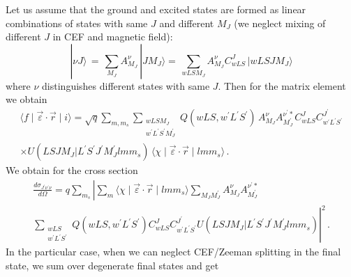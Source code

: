 \documentclass[a4paper,oneside,12pt]{extarticle}
\begin{document}
Let us assume that the ground and excited states are formed as linear combinations of states with same $J$ and different $M_J$ (we neglect mixing of different $J$ in CEF and magnetic field):
$$
| \nu J \rangle \, = \, \sum_{M_J} A^{\nu}_{M_J} \, | JM_J \rangle
= \, \sum_{wLS M_J} A^{\nu}_{M_J} C^J_{wLS} \, | wLSJM_J \rangle
$$
where $\nu$ distinguishes different states with same $J$.
Then for the matrix element we obtain
%
\begin{multline}
\langle f \mid \vec{\varepsilon} \cdot \vec{r}  \mid i \rangle = \sqrt{q}  
\sum_{m,m_s} \sum_{\substack{wLS M_J\\w^{\prime}L^{\prime} S^{\prime} M_J^{\prime}}}
Q(wLS,w^{\prime}L^{\prime} S^{\prime}) \, 
A^{\nu}_{M_J} A^{\nu^{\prime}*}_{M_J^{\prime}} C^J_{wLS} C^{J^{\prime}}_{w^{\prime}L^{\prime} S^{\prime}} \\
\times U(L S J M_J | L^{\prime} S^{\prime} J^{\prime} M_J^{\prime} l m m_s) \,
\langle \chi \mid \vec{\varepsilon} \cdot \vec{r}  \mid lmm_s \rangle \,.
\end{multline}
%
We obtain for the cross section
\begin{multline}
\frac{d \sigma_{J^{\prime}\nu^{\prime}\nu}}{d \Omega} = q \sum_{m_s} 
\left| \sum_m \langle \chi \mid \vec{\varepsilon} \cdot \vec{r}  \mid lmm_s \rangle 
\sum_{M_J M_J^{\prime}} A^{\nu}_{M_J} A^{\nu^{\prime}*}_{M_J^{\prime}} \right. \\
\left. 
\sum_{\substack{wLS \\w^{\prime}L^{\prime} S^{\prime} }} Q(wLS,w^{\prime}L^{\prime} S^{\prime})
C^J_{wLS} C^{J^{\prime}}_{w^{\prime}L^{\prime} S^{\prime}}
U(L S J M_J | L^{\prime} S^{\prime} J^{\prime} M_J^{\prime} l m m_s) \right|^2 \,.
\end{multline}
%
In the particular case, when we can neglect CEF/Zeeman splitting in the final state, we sum over degenerate final states and get
%
\end{document}
